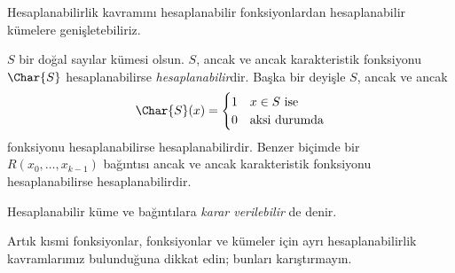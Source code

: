 


Hesaplanabilirlik kavramını hesaplanabilir fonksiyonlardan hesaplanabilir
kümelere genişletebiliriz.

\begin{defn}
  $S$ bir doğal sayılar kümesi olsun. $S$, ancak ve ancak karakteristik
  fonksiyonu $\Char{S}$ hesaplanabilirse \emph{hesaplanabilir}dir. Başka bir
  deyişle $S$, ancak ve ancak
  \[
    \Char{S}(x)=\begin{cases}
      1 & \text{$x\in S$ ise}\\
      0 & \text{aksi durumda}
    \end{cases}
  \]
  fonksiyonu hesaplanabilirse hesaplanabilirdir. Benzer biçimde bir
  $R(x_0,\dots,x_{k-1})$ bağıntısı ancak ve ancak karakteristik fonksiyonu
  hesaplanabilirse hesaplanabilirdir.

  Hesaplanabilir küme ve bağıntılara \emph{karar verilebilir} de denir.
\end{defn}

\begin{explain}
Artık kısmi fonksiyonlar, fonksiyonlar ve kümeler için ayrı hesaplanabilirlik
kavramlarımız bulunduğuna dikkat edin; bunları karıştırmayın.
\end{explain}

